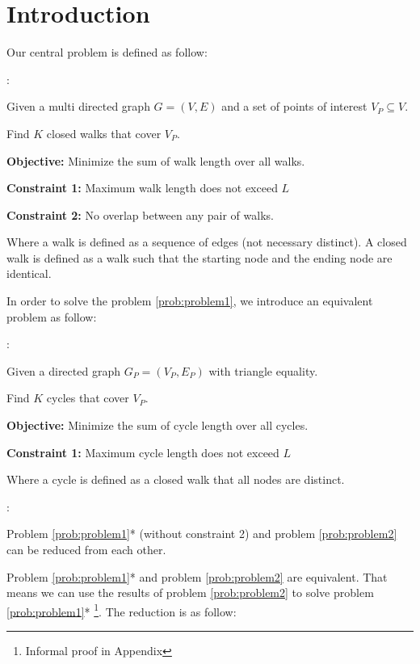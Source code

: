 \chapter{Introduction}

Our central problem is defined as follow:

\begin{problem}[Problem 1]:

Given a multi directed graph $G = (V, E)$ and a set of points of interest $V_P \subseteq V$.

Find $K$ closed walks that cover $V_P$.

\textbf{Objective:} Minimize the sum of walk length over all walks.

\textbf{Constraint 1:} Maximum walk length does not exceed $L$

\textbf{Constraint 2:} No overlap between any pair of walks.

\label{prob:problem1}
\end{problem}

Where a walk is defined as a sequence of edges (not necessary distinct). A closed walk is defined as a walk such that the starting node and the ending node are identical.


In order to solve the problem \ref{prob:problem1}, we introduce an equivalent problem as follow:

\begin{problem}[Problem 2]:

Given a directed graph $G_P = (V_P, E_P)$ with triangle equality.

Find $K$ cycles that cover $V_P$.

\textbf{Objective:} Minimize the sum of cycle length over all cycles.

\textbf{Constraint 1:} Maximum cycle length does not exceed $L$

\label{prob:problem2}
\end{problem}

Where a cycle is defined as a closed walk that all nodes are distinct.

\begin{theorem}[Theorem 1]:


Problem \ref{prob:problem1}* (without constraint 2) and problem \ref{prob:problem2} can be reduced from each other.
\label{theo:theorem1}
\end{theorem}

Problem \ref{prob:problem1}* and problem \ref{prob:problem2} are equivalent. That means we can use the results of problem \ref{prob:problem2} to solve problem \ref{prob:problem1}* \footnote{Informal proof in Appendix}. The reduction is as follow:


